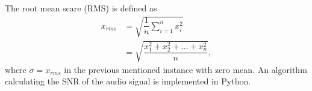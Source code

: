 The root mean scare (RMS) is defined as
\begin{align*}
	x_{rms} 
	&=\sqrt{\dfrac{1}{n} \sum_{i=1}^n x_i^2}\\
	&= \sqrt{\dfrac{x_1^2 + x_2^2 + \dots + x_n^2}{n}},
\end{align*}
where $\sigma = x_{rms}$ in the previous mentioned instance with zero mean. An algorithm calculating the SNR of the audio signal is implemented in Python.

%








